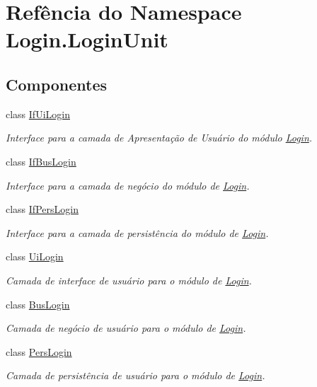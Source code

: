 \hypertarget{namespaceLogin_1_1LoginUnit}{\section{Refência do Namespace Login.\-Login\-Unit}
\label{d1/dc4/namespaceLogin_1_1LoginUnit}
}
\subsection*{Componentes}
\begin{DoxyCompactItemize}
\item 
class \hyperlink{classLogin_1_1LoginUnit_1_1IfUiLogin}{If\-Ui\-Login}
\begin{DoxyCompactList}\small\item\em Interface para a camada de Apresentação de Usuário do módulo \hyperlink{namespaceLogin}{Login}. \end{DoxyCompactList}\item 
class \hyperlink{classLogin_1_1LoginUnit_1_1IfBusLogin}{If\-Bus\-Login}
\begin{DoxyCompactList}\small\item\em Interface para a camada de negócio do módulo de \hyperlink{namespaceLogin}{Login}. \end{DoxyCompactList}\item 
class \hyperlink{classLogin_1_1LoginUnit_1_1IfPersLogin}{If\-Pers\-Login}
\begin{DoxyCompactList}\small\item\em Interface para a camada de persistência do módulo de \hyperlink{namespaceLogin}{Login}. \end{DoxyCompactList}\item 
class \hyperlink{classLogin_1_1LoginUnit_1_1UiLogin}{Ui\-Login}
\begin{DoxyCompactList}\small\item\em Camada de interface de usuário para o módulo de \hyperlink{namespaceLogin}{Login}. \end{DoxyCompactList}\item 
class \hyperlink{classLogin_1_1LoginUnit_1_1BusLogin}{Bus\-Login}
\begin{DoxyCompactList}\small\item\em Camada de negócio de usuário para o módulo de \hyperlink{namespaceLogin}{Login}. \end{DoxyCompactList}\item 
class \hyperlink{classLogin_1_1LoginUnit_1_1PersLogin}{Pers\-Login}
\begin{DoxyCompactList}\small\item\em Camada de persistência de usuário para o módulo de \hyperlink{namespaceLogin}{Login}. \end{DoxyCompactList}\end{DoxyCompactItemize}
